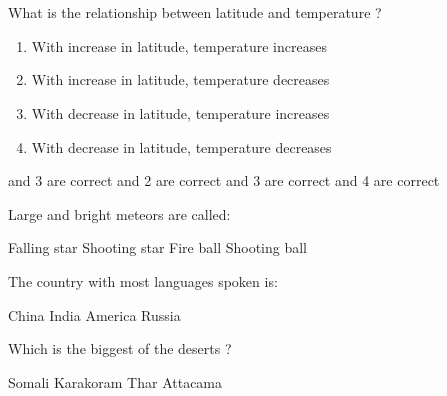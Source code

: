 \section*{}

\subsection*{}

\begin{questions}

\question What is the relationship between latitude and temperature ?
  \begin{enumerate}
  \item With increase in latitude, temperature increases
  \item With increase in latitude, temperature decreases
  \item With decrease in latitude, temperature increases
  \item With decrease in latitude, temperature decreases
  \end{enumerate}

  \begin{choices}
   and 3 are correct
   and 2 are correct
   and 3 are correct
   and 4 are correct
  \end{choices}

\question Large and bright meteors are called:
  \begin{choices}
  \choice Falling star
  \choice Shooting star
  \CorrectChoice Fire ball
  \choice Shooting ball
  \end{choices}

\question The country with most languages spoken is:

  \begin{oneparchoices}
  \choice China
  \CorrectChoice India
  \choice America
  \choice Russia
  \end{oneparchoices}

\question Which is the biggest of the deserts ?

  \begin{oneparchoices}
  \choice Somali
  \CorrectChoice Karakoram
  \choice Thar
  \choice Attacama
  \end{oneparchoices}


\end{questions}
